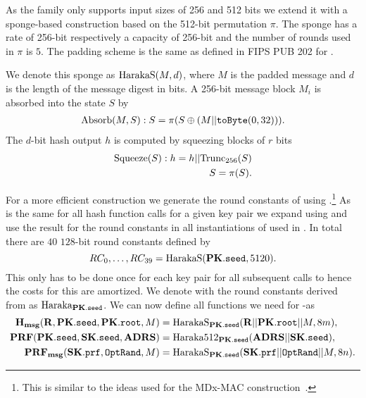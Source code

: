    As
   the \haraka family only supports input sizes of 256 and 512 bits we extend it
   with a sponge-based construction based on the 512-bit permutation $\pi$. The
   sponge has a rate of 256-bit respectively a capacity of 256-bit and the
   number of rounds used in $\pi$ is $5$. The padding scheme is the same as
   defined in FIPS PUB 202 for \shathree.

   We denote this sponge as $\text{HarakaS}(M, d)$, where $M$ is the padded
   message and $d$ is the length of the message digest in bits. A 256-bit
   message block $M_i$ is absorbed into the state $S$ by
   \begin{equation}
      \begin{aligned}
      \text{Absorb}(M, S): S = \pi(S \oplus (M || \texttt{toByte}(0, 32))).
      \end{aligned}
   \end{equation}
   The $d$-bit hash output $h$ is computed by squeezing blocks of $r$ bits
   \begin{equation}
      \begin{aligned}
      \text{Squeeze}(S): h = h || \text{Trunc}_{256}(S)\\
                         S = \pi(S).
      \end{aligned}
   \end{equation}

   For a more efficient construction we generate the round constants of
   \haraka using \pseed.\footnote{This is similar to the ideas used for the
   MDx-MAC construction~\cite{DBLP:conf/crypto/PrenelO95}.} As \pseed is the
   same for all hash function calls for a given key pair we expand \pseed
   using \harakasponge and use the result for the round constants in all
   instantiations of \haraka used in \spx. In total there are $40$ $128$-bit
   round constants defined by
   \begin{equation}
      RC_0,\ldots,RC_{39} = \text{HarakaS}(\mathbf{PK}.\texttt{seed}, 5120).
   \end{equation}
   This only has to be done once for each key pair for all subsequent calls
   to \haraka hence the costs for this are amortized. We denote \haraka with
   the round constants derived from \pseed as $\text{Haraka}_{\mathbf{PK}.\texttt{seed}}$. We can now define
   all functions we need for \spx-\haraka as
   \begin{equation}
   \begin{aligned}
      \mathbf{H_{msg}}(\mathbf{R},\mathbf{PK}.\texttt{seed}, \mathbf{PK}.\texttt{root}, M) &= \text{HarakaS}_{\mathbf{PK}.\texttt{seed}}(\mathbf{R} || \mathbf{PK}.\texttt{root} || M, 8m),\\
      \mathbf{PRF}(\mathbf{PK}.\texttt{seed}, \mathbf{SK}.\texttt{seed}, \textbf{ADRS}) &= \text{Haraka}512_{\mathbf{PK}.\texttt{seed}}(\textbf{ADRS} || \mathbf{SK}.\texttt{seed}),\\
      \mathbf{PRF_{msg}}(\mathbf{SK}.\texttt{prf}, \texttt{OptRand}, M) &= \text{HarakaS}_{\mathbf{PK}.\texttt{seed}}(\mathbf{SK}.\texttt{prf} || \texttt{OptRand} || M, 8n).\\
   \end{aligned}
   \end{equation}

